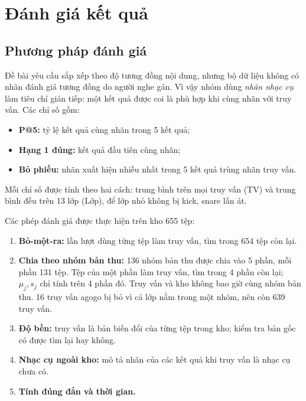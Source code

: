 \documentclass[11pt,a4paper]{article}
\begin{document}
\section{Đánh giá kết quả}\label{sec:danhgia}
\subsection{Phương pháp đánh giá}
Đề bài yêu cầu sắp xếp theo độ tương đồng nội dung, nhưng bộ dữ liệu không có nhãn đánh giá tương đồng do người nghe gán. Vì vậy nhóm dùng \emph{nhãn nhạc cụ} làm tiêu chí gián tiếp: một kết quả được coi là phù hợp khi cùng nhãn với truy vấn. Các chỉ số gồm:
\begin{itemize}
\item \textbf{P@5:} tỷ lệ kết quả cùng nhãn trong 5 kết quả;
\item \textbf{Hạng 1 đúng:} kết quả đầu tiên cùng nhãn;
\item \textbf{Bỏ phiếu:} nhãn xuất hiện nhiều nhất trong 5 kết quả trùng nhãn truy vấn.
\end{itemize}
Mỗi chỉ số được tính theo hai cách: trung bình trên mọi truy vấn (TV) và trung bình đều trên 13 lớp (Lớp), để lớp nhỏ không bị kick, snare lấn át.

Các phép đánh giá được thực hiện trên kho 655 tệp:
\begin{enumerate}
\item \textbf{Bỏ-một-ra:} lần lượt dùng từng tệp làm truy vấn, tìm trong 654 tệp còn lại.
\item \textbf{Chia theo nhóm bản thu:} 136 nhóm bản thu được chia vào 5 phần, mỗi phần 131 tệp. Tệp của một phần làm truy vấn, tìm trong 4 phần còn lại; $\mu_j, s_j$ chỉ tính trên 4 phần đó. Truy vấn và kho không bao giờ cùng nhóm bản thu. 16 truy vấn agogo bị bỏ vì cả lớp nằm trong một nhóm, nên còn 639 truy vấn.
\item \textbf{Độ bền:} truy vấn là bản biến đổi của từng tệp trong kho; kiểm tra bản gốc có được tìm lại hay không.
\item \textbf{Nhạc cụ ngoài kho:} mô tả nhãn của các kết quả khi truy vấn là nhạc cụ chưa có.
\item \textbf{Tính đúng đắn và thời gian.}
\end{enumerate}
\end{document}
